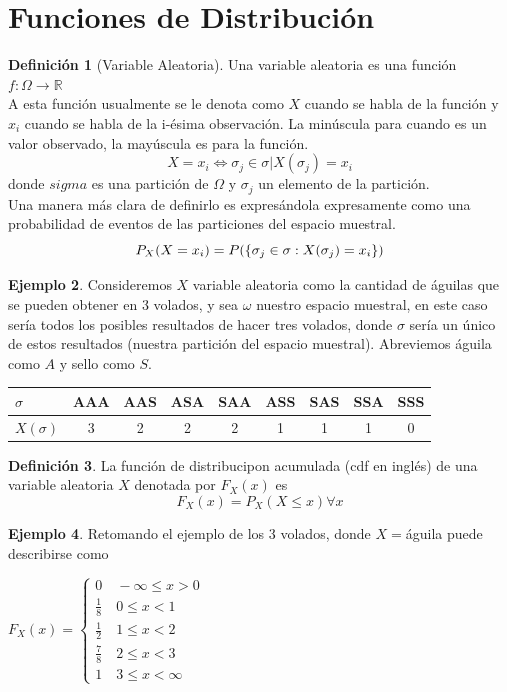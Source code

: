 \documentclass[11pt,a4paper,oneside]{report}
\theoremstyle{definition}
\newtheorem{definicion}{Definición}[chapter]
\newtheorem{ejemplo}[definicion]{Ejemplo}
\theoremstyle{plain}
\theoremstyle{remark}
\newcommand{\R}{\mathbb{R}}
\DeclarePairedDelimiter{\conj}{\{}{\}}
\begin{document}
\section{Funciones de Distribución}

\begin{definicion}[Variable Aleatoria]
  Una variable aleatoria es una función $f:\Omega \rightarrow \R$\\
  A esta función usualmente se le denota como $X$ cuando se habla de la función y $x_i$ 
  cuando se habla de la i-ésima observación. La minúscula para cuando es un valor observado, la mayúscula 
  es para la función.
  \[ X=x_i \iff \sigma_j \in \sigma | X(\sigma_j)=x_i\] donde $sigma$ es una partición de $\Omega$ y $\sigma_j$ un elemento de la partición.\\
  Una manera más clara de definirlo es expresándola expresamente como una probabilidad de eventos de las particiones 
  del espacio muestral.
  \[ P_X(X=x_i)=P(\conj{\sigma_j \in \sigma: X(\sigma_j)=x_i}) \]
\end{definicion}

\begin{ejemplo}
  Consideremos $X$ variable aleatoria como la cantidad de águilas que se pueden obtener en 3 volados, y sea 
  $\omega$ nuestro espacio muestral, en este caso sería todos los posibles resultados de hacer tres volados, donde
  $\sigma$ sería un único de estos resultados (nuestra partición del espacio muestral).
  Abreviemos águila como $A$ y sello como $S$.

  \begin{table}[H]
  \centering
  \label{tab:volados}
  \begin{tabular}{@{}lcccccccc@{}}
    \toprule
    $\sigma$ & AAA & AAS & ASA & SAA & ASS & SAS & SSA & SSS \\
    \midrule
    $X(\sigma)$ & 3 & 2 & 2 & 2 & 1 & 1 & 1 & 0 \\
    \bottomrule
  \end{tabular}
\end{table}

\end{ejemplo}


\begin{definicion}
  La función de distribucipon acumulada (cdf en inglés) de una variable aleatoria $X$ denotada por 
  $F_{X}(x)$ es 
  \[ F_X(x)=P_X(X\leq x) \forall x\]
\end{definicion}

\begin{ejemplo}
  Retomando el ejemplo de los 3 volados, donde $X=$águila puede describirse como

  $F_X(x)=\left\{
  \begin{array}{l}
    0 \quad -\infty \leq x > 0 \\
    \frac{1}{8} \quad 0 \leq x < 1 \\
    \frac{1}{2} \quad 1 \leq x < 2 \\
    \frac{7}{8} \quad 2 \leq x < 3 \\
    1 \quad 3\leq x < \infty
  \end{array}
\right.$
\end{ejemplo}
\end{document}
